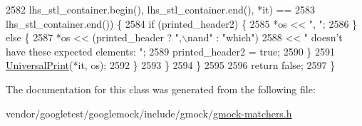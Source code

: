 \begin{DoxyCode}
2582                 lhs\_stl\_container.begin(), lhs\_stl\_container.end(), *it) ==
2583             lhs\_stl\_container.end()) \{
2584           \textcolor{keywordflow}{if} (printed\_header2) \{
2585             *os << \textcolor{stringliteral}{", "};
2586           \} \textcolor{keywordflow}{else} \{
2587             *os << (printed\_header ? \textcolor{stringliteral}{",\(\backslash\)nand"} : \textcolor{stringliteral}{"which"})
2588                 << \textcolor{stringliteral}{" doesn't have these expected elements: "};
2589             printed\_header2 = \textcolor{keyword}{true};
2590           \}
2591           \hyperlink{namespacetesting_1_1internal_ad121a890bddf866e59605d1a0198dada}{UniversalPrint}(*it, os);
2592         \}
2593       \}
2594     \}
2595 
2596     \textcolor{keywordflow}{return} \textcolor{keyword}{false};
2597   \}
\end{DoxyCode}


The documentation for this class was generated from the following file\+:\begin{DoxyCompactItemize}
\item 
vendor/googletest/googlemock/include/gmock/\hyperlink{gmock-matchers_8h}{gmock-\/matchers.\+h}\end{DoxyCompactItemize}
